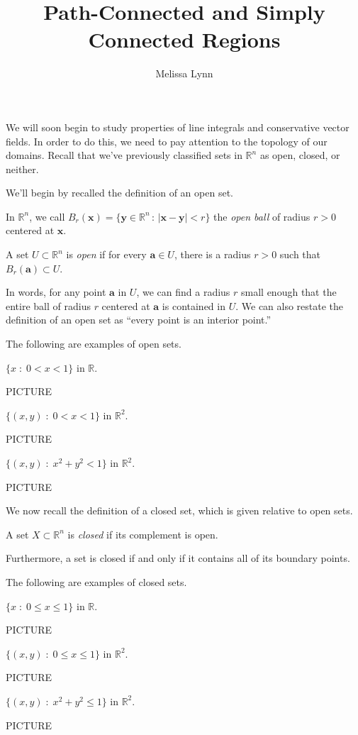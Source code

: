 \documentclass{ximera}
\title{Path-Connected and Simply Connected Regions}
\author{Melissa Lynn}
\begin{document}
 
\begin{abstract}
\end{abstract} 
\maketitle

We will soon begin to study properties of line integrals and conservative vector fields. In order to do this, we need to pay attention to the topology of our domains. Recall that we've previously classified sets in $\mathbb{R}^n$ as open, closed, or neither.

We'll begin by recalled the definition of an open set.

\begin{definition}
In $\mathbb{R}^n$, we call $B_r(\mathbf{x})=\{\mathbf{y}\in\mathbb{R}^n\,:\,|\mathbf{x}-\mathbf{y}|<r\}$ the \emph{open ball} of radius $r>0$ centered at $\mathbf{x}$.

A set $U\subset \mathbb{R}^n$ is \emph{open} if for every $\mathbf{a}\in U$, there is a radius $r>0$ such that $B_r(\mathbf{a})\subset U$.
\end{definition}

In words, for any point $\mathbf{a}$ in $U$, we can find a radius $r$ small enough that the entire ball of radius $r$ centered at $\mathbf{a}$ is contained in $U$. We can also restate the definition of an open set as ``every point is an interior point.''

\begin{example}
The following are examples of open sets.

$\{x\;:\;0<x<1\}$ in $\mathbb{R}$.

PICTURE

$\{(x,y)\;:\;0<x<1\}$ in $\mathbb{R}^2$.

PICTURE

$\{(x,y)\;:\;x^2+y^2<1\}$ in $\mathbb{R}^2$.

PICTURE
\end{example}

We now recall the definition of a closed set, which is given relative to open sets.

\begin{definition}
A set $X\subset \mathbb{R}^n$ is \emph{closed} if its complement is open.
\end{definition}

Furthermore, a set is closed if and only if it contains all of its boundary points.

\begin{example}
The following are examples of closed sets.

$\{x\;:\;0\leq x\leq 1\}$ in $\mathbb{R}$.

PICTURE

$\{(x,y)\;:\;0\leq x\leq 1\}$ in $\mathbb{R}^2$.

PICTURE

$\{(x,y)\;:\;x^2+y^2\leq 1\}$ in $\mathbb{R}^2$.

PICTURE
\end{example}
\end{document}
